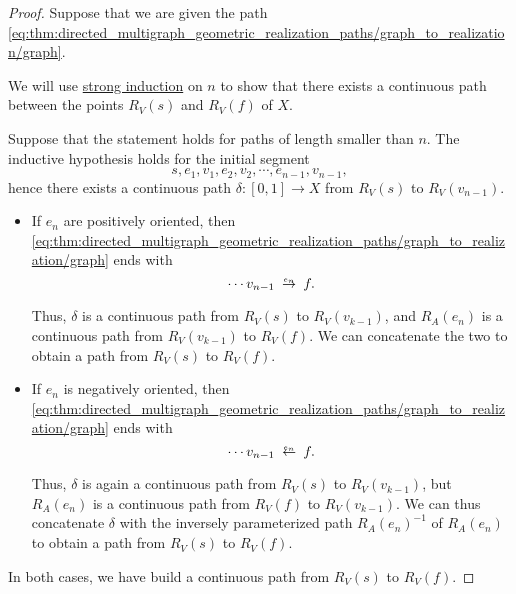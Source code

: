 \begin{proof}
   Suppose that we are given the path \eqref{eq:thm:directed_multigraph_geometric_realization_paths/graph_to_realization/graph}.

  We will use \hyperref[rem:induction/well_founded]{strong induction} on \( n \) to show that there exists a continuous path between the points \( R_V(s) \) and \( R_V(f)  \) of \( X \).

  Suppose that the statement holds for paths of length smaller than \( n \). The inductive hypothesis holds for the initial segment
  \begin{equation*}
    s, e_1, v_1, e_2, v_2, \cdots, e_{n-1}, v_{n-1},
  \end{equation*}
  hence there exists a continuous path \( \delta: [0, 1] \to X \) from \( R_V(s) \) to \( R_V(v_{n-1}) \).

  \begin{itemize}
    \item If \( e_n \) are positively oriented, then \eqref{eq:thm:directed_multigraph_geometric_realization_paths/graph_to_realization/graph} ends with
    \begin{equation*}
      \cdots v_{n-1} \reloset{e_n} \to f.
    \end{equation*}

    Thus, \( \delta \) is a continuous path from \( R_V(s) \) to \( R_V(v_{k-1}) \), and \( R_A(e_n) \) is a continuous path from \( R_V(v_{k-1}) \) to \( R_V(f) \). We can concatenate the two to obtain a path from \( R_V(s)  \) to \( R_V(f) \).

    \item If \( e_n \) is negatively oriented, then \eqref{eq:thm:directed_multigraph_geometric_realization_paths/graph_to_realization/graph} ends with
    \begin{equation*}
      \cdots v_{n-1} \reloset{e_n} \leftarrow f.
    \end{equation*}

    Thus, \( \delta \) is again a continuous path from \( R_V(s) \) to \( R_V(v_{k-1}) \), but \( R_A(e_n) \) is a continuous path from \( R_V(f) \) to \( R_V(v_{k-1}) \). We can thus concatenate \( \delta \) with the inversely parameterized path \( R_A(e_n)^{-1} \) of \( R_A(e_n) \) to obtain a path from \( R_V(s) \) to \( R_V(f) \).
  \end{itemize}

  In both cases, we have build a continuous path from \( R_V(s) \) to \( R_V(f)  \).


\end{proof}
